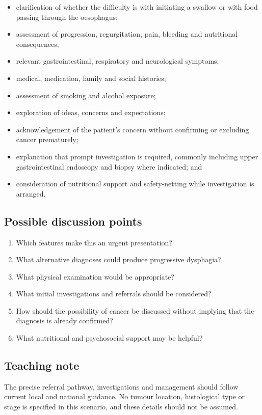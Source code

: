 \begin{itemize}
    \item clarification of whether the difficulty is with initiating a
    swallow or with food passing through the oesophagus;
    \item assessment of progression, regurgitation, pain, bleeding and
    nutritional consequences;
    \item relevant gastrointestinal, respiratory and neurological
    symptoms;
    \item medical, medication, family and social histories;
    \item assessment of smoking and alcohol exposure;
    \item exploration of ideas, concerns and expectations;
    \item acknowledgement of the patient's concern without confirming
    or excluding cancer prematurely;
    \item explanation that prompt investigation is required, commonly
    including upper gastrointestinal endoscopy and biopsy where
    indicated; and
    \item consideration of nutritional support and safety-netting while
    investigation is arranged.
\end{itemize}

\subsection*{Possible discussion points}

\begin{enumerate}
    \item Which features make this an urgent presentation?
    \item What alternative diagnoses could produce progressive
    dysphagia?
    \item What physical examination would be appropriate?
    \item What initial investigations and referrals should be
    considered?
    \item How should the possibility of cancer be discussed without
    implying that the diagnosis is already confirmed?
    \item What nutritional and psychosocial support may be helpful?
\end{enumerate}

\subsection*{Teaching note}

The precise referral pathway, investigations and management should
follow current local and national guidance. No tumour location,
histological type or stage is specified in this scenario, and these
details should not be assumed.
